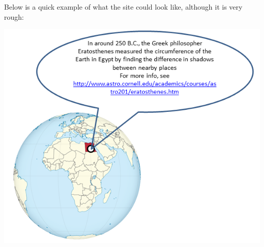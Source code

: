 \documentclass[11pt]{article}
\begin{document}
Below is a quick example of what the site could look like, although it is very rough:

\begin{center}
\includegraphics[scale=0.6]{projectpropimg.png}
\end{center}
\end{document}
